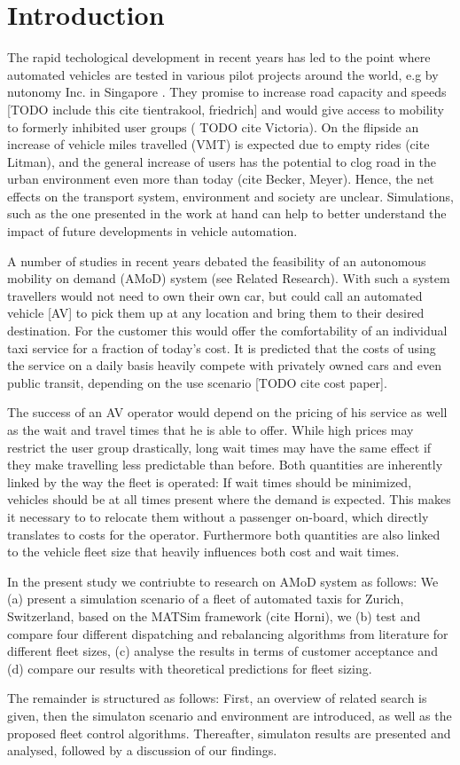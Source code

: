 \section{Introduction}

The rapid techological development in recent years has led to the point where
automated vehicles are tested in various pilot projects around the world, e.g by nutonomy Inc. in Singapore \citep{ackerman2017hail}. They promise to increase road capacity and speeds
[TODO include this cite tientrakool, friedrich] and would give access to mobility to formerly
inhibited user groups ( TODO cite Victoria). On the flipside an increase of vehicle
miles travelled (VMT) is expected due to empty rides (cite Litman), and the general increase
of users has the potential to clog road in the urban environment even more than today (cite Becker, Meyer).
Hence, the net effects on
the transport system, environment and society are unclear. Simulations, such as
the one presented in the work at hand can help to better understand the impact
of future developments in vehicle automation.

A number of studies in recent years debated the feasibility of an autonomous
mobility on demand (AMoD) system (see Related Research). With such a system travellers would not need to own their own car, but could call an automated vehicle [AV] to pick them up at any location and bring them to their desired destination. For the customer this would offer the comfortability of an individual taxi service
for a fraction of today's cost. It is predicted that the costs of using the
service on a daily basis heavily compete with privately owned cars and even
public transit, depending on the use scenario [TODO cite cost paper].

The success of an AV operator would depend on the pricing of his service
as well as the wait and travel times that he is able to offer. While high prices
may restrict the user group drastically, long wait times may have the same effect
if they make travelling less predictable than before. Both quantities are inherently
linked by the way the fleet is operated: If wait times should be minimized, vehicles
should be at all times present where the demand is expected. This makes it necessary to to relocate them without a passenger on-board, which directly translates to costs for the operator. Furthermore both quantities are also linked to the vehicle fleet size that heavily influences both cost and wait times.

In the present study we contriubte to research on AMoD system as follows: We
(a) present a simulation scenario of a fleet of automated taxis for Zurich, Switzerland,
based on the MATSim framework (cite Horni), we (b) test and compare four different dispatching
and rebalancing algorithms from literature for different fleet sizes, (c) analyse the results
in terms of customer acceptance and (d) compare our results with theoretical
predictions for fleet sizing.

The remainder is structured as follows: First, an overview of related search is
given, then the simulaton scenario and environment are introduced, as well as the
proposed fleet control algorithms. Thereafter, simulaton results are presented and
analysed, followed by a discussion of our findings.
